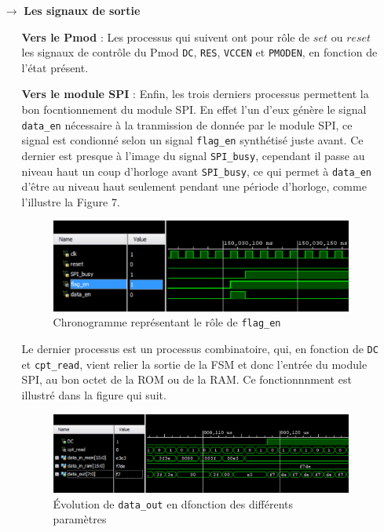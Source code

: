 \documentclass[11pt]{article}
\begin{document}
\begin{itemize}
\begin{itemize}
\end{itemize}

\item[$\rightarrow$] \textbf{Les signaux de sortie}

\begin{itemize}

\item[\textbullet] \textbf{Vers le Pmod} : Les processus qui suivent ont pour rôle de $set$ ou $reset$ les signaux de contrôle du Pmod \texttt{DC}, \texttt{RES}, \texttt{VCCEN} et \texttt{PMODEN}, en fonction de l'état présent.

\item[\textbullet] \textbf{Vers le module SPI} : Enfin, les trois derniers processus permettent la bon focntionnement du module SPI. En effet l'un d'eux génère le signal \texttt{data\_en} nécessaire à la tranmission de donnée par le module SPI, ce signal est condionné selon un signal \texttt{flag\_en} synthétisé juste avant. Ce dernier est presque à l'image du signal \texttt{SPI\_busy}, cependant il passe au niveau haut un coup d'horloge avant \texttt{SPI\_busy}, ce qui permet à \texttt{data\_en} d'être au niveau haut seulement pendant une période d'horloge, comme l'illustre la Figure 7.

\begin{figure}[H]
\begin{center}
\includegraphics[scale = 0.4, keepaspectratio]{chrono_flag_en}
\caption{Chronogramme représentant le rôle de \texttt{flag\_en}}
\end{center}
\end{figure}

Le dernier processus est un processus combinatoire, qui, en fonction de \texttt{DC} et \texttt{cpt\_read}, vient relier la sortie de la FSM et donc l'entrée du module SPI, au bon octet de la ROM ou de la RAM. Ce fonctionnnment est illustré dans la figure qui suit.

\begin{figure}[H]
\begin{center}
\includegraphics[scale = 0.4, keepaspectratio]{chrono_out}
\caption{Évolution de \texttt{data\_out} en dfonction des différents paramètres}
\end{center}
\end{figure}


\end{itemize}
\end{itemize}
\end{document}
